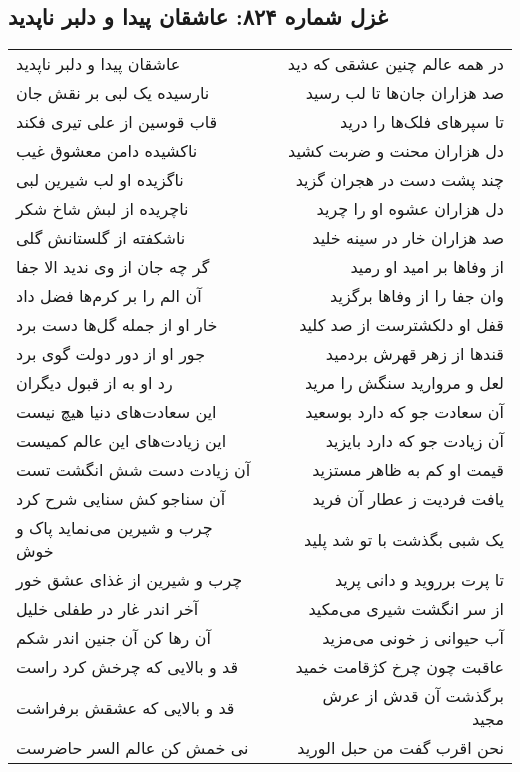 \begin{center}
\section*{غزل شماره ۸۲۴: عاشقان پیدا و دلبر ناپدید}
\label{sec:0824}
\begin{longtable}{l p{0.5cm} r}
عاشقان پیدا و دلبر ناپدید
&&
در همه عالم چنین عشقی که دید
\\
نارسیده یک لبی بر نقش جان
&&
صد هزاران جان‌ها تا لب رسید
\\
قاب قوسین از علی تیری فکند
&&
تا سپرهای فلک‌ها را درید
\\
ناکشیده دامن معشوق غیب
&&
دل هزاران محنت و ضربت کشید
\\
ناگزیده او لب شیرین لبی
&&
چند پشت دست در هجران گزید
\\
ناچریده از لبش شاخ شکر
&&
دل هزاران عشوه او را چرید
\\
ناشکفته از گلستانش گلی
&&
صد هزاران خار در سینه خلید
\\
گر چه جان از وی ندید الا جفا
&&
از وفاها بر امید او رمید
\\
آن الم را بر کرم‌ها فضل داد
&&
وان جفا را از وفاها برگزید
\\
خار او از جمله گل‌ها دست برد
&&
قفل او دلکشترست از صد کلید
\\
جور او از دور دولت گوی برد
&&
قندها از زهر قهرش بردمید
\\
رد او به از قبول دیگران
&&
لعل و مروارید سنگش را مرید
\\
این سعادت‌های دنیا هیچ نیست
&&
آن سعادت جو که دارد بوسعید
\\
این زیادت‌های این عالم کمیست
&&
آن زیادت جو که دارد بایزید
\\
آن زیادت دست شش انگشت تست
&&
قیمت او کم به ظاهر مستزید
\\
آن سناجو کش سنایی شرح کرد
&&
یافت فردیت ز عطار آن فرید
\\
چرب و شیرین می‌نماید پاک و خوش
&&
یک شبی بگذشت با تو شد پلید
\\
چرب و شیرین از غذای عشق خور
&&
تا پرت برروید و دانی پرید
\\
آخر اندر غار در طفلی خلیل
&&
از سر انگشت شیری می‌مکید
\\
آن رها کن آن جنین اندر شکم
&&
آب حیوانی ز خونی می‌مزید
\\
قد و بالایی که چرخش کرد راست
&&
عاقبت چون چرخ کژقامت خمید
\\
قد و بالایی که عشقش برفراشت
&&
برگذشت آن قدش از عرش مجید
\\
نی خمش کن عالم السر حاضرست
&&
نحن اقرب گفت من حبل الورید
\\
\end{longtable}
\end{center}
